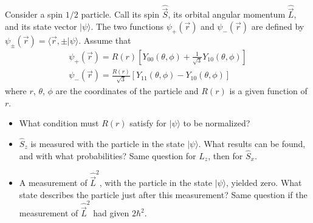 \documentclass[10pt,a4paper]{article}
\newenvironment{problem}[2][Problem]{\begin{trivlist}
\item[\hskip \labelsep {\bfseries #1}\hskip \labelsep {\bfseries #2.}]}{\end{trivlist}}
\begin{document}
\begin{problem}{1}
[C-T Exercise 9-1] Consider a spin $1/2$ particle. Call its spin $\hat{\vec{S}}$, its orbital angular momentum $\hat{\vec{L}}$, and its state vector $|\psi\rangle$. The two functions $\psi_+(\vec{r})$ and $\psi_-(\vec{r})$ are defined by $\psi_{\pm}(\vec{r})=\langle\vec{r},\pm|\psi\rangle$. Assume that
\begin{gather}
\psi_+(\vec{r})=R(r)\left[Y_{00}(\theta,\phi)+\frac{1}{\sqrt{3}}Y_{10}(\theta,\phi)\right]\\
\psi_-(\vec{r})=\frac{R(r)}{\sqrt{3}}\left[Y_{11}(\theta,\phi)-Y_{10}(\theta,\phi)\right]
\end{gather}
where $r$, $\theta$, $\phi$ are the coordinates of the particle and $R(r)$ is a given function of $r$.
\begin{itemize}
\item[(a)] What condition must $R(r)$ satisfy for $|\psi\rangle$ to be normalized?
\item[(b)] $\hat{S}_z$ is measured with the particle in the state $|\psi\rangle$. What results can be found, and with what probabilities? Same question for $\hat{L}_z$, then for $\hat{S}_x$.
\item[(c)] A measurement of $\hat{\vec{L}}^2$, with the particle in the state $|\psi\rangle$, yielded zero. What state describes the particle just after this measurement? Same question if the measurement of $\hat{\vec{L}}^2$ had given $2\hbar^2$.
\end{itemize}
\end{problem}
\end{document}
